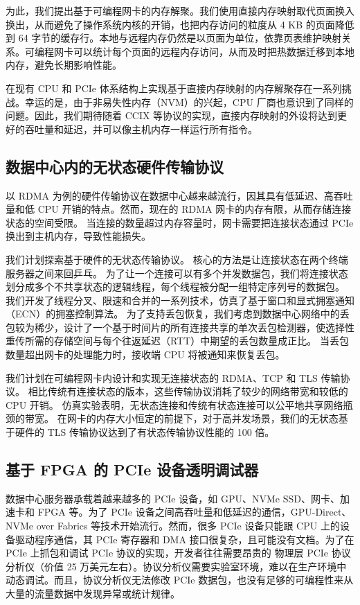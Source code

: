 为此，我们提出基于可编程网卡的内存解聚。我们使用直接内存映射取代页面换入换出，从而避免了操作系统内核的开销，也把内存访问的粒度从 4 KB 的页面降低到 64 字节的缓存行。本地与远程内存仍然是以页面为单位，依靠页表维护映射关系。可编程网卡可以统计每个页面的远程内存访问，从而及时把热数据迁移到本地内存，避免长期影响性能。

在现有 CPU 和 PCIe 体系结构上实现基于直接内存映射的内存解聚存在一系列挑战。幸运的是，由于非易失性内存（NVM）的兴起，CPU 厂商也意识到了同样的问题。因此，我们期待随着 CCIX 等协议的实现，直接内存映射的外设将达到更好的吞吐量和延迟，并可以像主机内存一样运行所有指令。


\subsection{数据中心内的无状态硬件传输协议}

以 RDMA 为例的硬件传输协议在数据中心越来越流行，因其具有低延迟、高吞吐量和低 CPU 开销的特点。然而，现在的 RDMA 网卡的内存有限，从而存储连接状态的空间受限。
当连接的数量超过内存容量时，网卡需要把连接状态通过 PCIe 换出到主机内存，导致性能损失。

我们计划探索基于硬件的无状态传输协议。
核心的方法是让连接状态在两个终端服务器之间来回乒乓。
为了让一个连接可以有多个并发数据包，我们将连接状态划分成多个不共享状态的逻辑线程，每个线程被分配一组特定序列号的数据包。
我们开发了线程分叉、限速和合并的一系列技术，仿真了基于窗口和显式拥塞通知（ECN）的拥塞控制算法。
为了支持丢包恢复，我们考虑到数据中心网络中的丢包较为稀少，设计了一个基于时间片的所有连接共享的单次丢包检测器，使选择性重传所需的存储空间与每个往返延迟（RTT）中期望的丢包数量成正比。
当丢包数量超出网卡的处理能力时，接收端 CPU 将被通知来恢复丢包。

我们计划在可编程网卡内设计和实现无连接状态的 RDMA、TCP 和 TLS 传输协议。
相比传统有连接状态的版本，这些传输协议消耗了较少的网络带宽和较低的 CPU 开销。
仿真实验表明，无状态连接和传统有状态连接可以公平地共享网络瓶颈的带宽。
在网卡的内存大小恒定的前提下，对于高并发场景，我们的无状态基于硬件的 TLS 传输协议达到了有状态传输协议性能的 100 倍。



\subsection{基于 FPGA 的 PCIe 设备透明调试器}

数据中心服务器承载着越来越多的 PCIe 设备，如 GPU、NVMe SSD、网卡、加速卡和 FPGA 等。为了 PCIe 设备之间高吞吐量和低延迟的通信，GPU-Direct、NVMe over Fabrics 等技术开始流行。然而，很多 PCIe 设备只能跟 CPU 上的设备驱动程序通信，其 PCIe 寄存器和 DMA 接口很复杂，且可能没有文档。为了在 PCIe 上抓包和调试 PCIe 协议的实现，开发者往往需要昂贵的 物理层 PCIe 协议分析仪（价值 25 万美元左右）。协议分析仪需要实验室环境，难以在生产环境中动态调试。而且，协议分析仪无法修改 PCIe 数据包，也没有足够的可编程性来从大量的流量数据中发现异常或统计规律。


